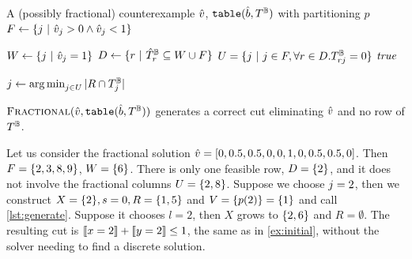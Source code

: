 \documentclass[a4paper,UKenglish,cleveref,autoref,thm-restate]{lipics-v2021}
\begin{document}
\begin{algorithm}
\caption{The \lazyFractional algorithm for Boolean table constraints}
\label{lst:frac}
\begin{algorithmic}[1]
    \Require A (possibly fractional) counterexample $\hat{v}$, $\texttt{table}(\hat{b},T^{\mathbb{B}})$ with partitioning $p$
    \Function{\lazyFractional}{\generateInitArgs}
    \State $F \gets \{j ~|~ \hat{v}_j > 0 \wedge \hat{v}_j < 1\}$
    \label{lst:frac:F}
        \State \Return \Call{\lazyGenerate}{\generateInitArgs}
    \EndIf
    
    \State $W \gets \{j ~|~ \hat{v}_j = 1\}$
    \State $D \gets \{r ~|~ \hat{T}^{\mathbb{B}}_r \subseteq W \cup F\}$ 
    \label{lst:frac:D}
    \State $U = \{j ~|~ j \in F, \forall r \in D.T^{\mathbb{B}}_{rj} = 0\}$
    \label{lst:frac:U}
        \State \Return $\mathit{true}$
    \EndIf
    
    \State $j \gets \operatorname*{arg\,min}_{j \in U} |R \cap T^{\mathbb{B}}_j|$
    \label{lst:frac:choose}
    \State \Return {}
    \EndFunction
\end{algorithmic}
\end{algorithm}


\begin{theorem}
\label{thm:valid}
   $\Call{\lazyFractional}{\generateInitArgs}$ generates a correct cut eliminating $\hat{v}$ and no row of $T^{\mathbb{B}}$.
\end{theorem}

\begin{example}
\label{ex:generate-frac}
    Let us consider the fractional solution 
    $\hat{v} = [0,0.5,0.5,0,0,1,0,0.5,0.5,0]$.
    Then $F = \{2,3,8,9\}$, $W = \{6\}$. There is only one feasible row, 
    $D = \{2\}$, and it does not involve the fractional columns $U = \{2,8\}$.
    Suppose we choose $j = 2$, then we 
    construct $X = \{2\}, s = 0, R = \{1,5\}$ and $V = \{p(2)\} = \{1\}$ and call \cref{lst:generate}. 
    Suppose it chooses $l = 2$, then $X$ grows to $\{2,6\}$
    and $R = \emptyset$.
    The resulting cut is $\be{1}{2} + \be{2}{2} \leq 1$, the same as in \cref{ex:initial}, without the solver needing to find a discrete solution.
\end{example}
\end{document}
